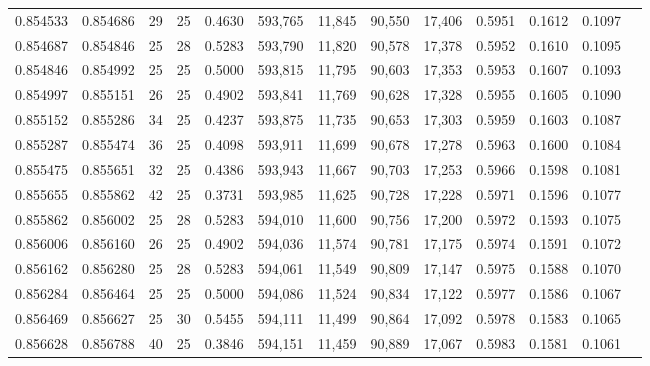 \begin{tabular}{rrrrrrrrrrrrr}
0.854533 & 0.854686 &    29 &  25 &                                     0.4630 & 593,765 &  11,845 &  90,550 &  17,406 & 0.5951 & 0.1612 & 0.1097 \\
0.854687 & 0.854846 &    25 &  28 &                                     0.5283 & 593,790 &  11,820 &  90,578 &  17,378 & 0.5952 & 0.1610 & 0.1095 \\
0.854846 & 0.854992 &    25 &  25 &                                     0.5000 & 593,815 &  11,795 &  90,603 &  17,353 & 0.5953 & 0.1607 & 0.1093 \\
0.854997 & 0.855151 &    26 &  25 &                                     0.4902 & 593,841 &  11,769 &  90,628 &  17,328 & 0.5955 & 0.1605 & 0.1090 \\
0.855152 & 0.855286 &    34 &  25 &                                     0.4237 & 593,875 &  11,735 &  90,653 &  17,303 & 0.5959 & 0.1603 & 0.1087 \\
0.855287 & 0.855474 &    36 &  25 &                                     0.4098 & 593,911 &  11,699 &  90,678 &  17,278 & 0.5963 & 0.1600 & 0.1084 \\
0.855475 & 0.855651 &    32 &  25 &                                     0.4386 & 593,943 &  11,667 &  90,703 &  17,253 & 0.5966 & 0.1598 & 0.1081 \\
0.855655 & 0.855862 &    42 &  25 &                                     0.3731 & 593,985 &  11,625 &  90,728 &  17,228 & 0.5971 & 0.1596 & 0.1077 \\
0.855862 & 0.856002 &    25 &  28 &                                     0.5283 & 594,010 &  11,600 &  90,756 &  17,200 & 0.5972 & 0.1593 & 0.1075 \\
0.856006 & 0.856160 &    26 &  25 &                                     0.4902 & 594,036 &  11,574 &  90,781 &  17,175 & 0.5974 & 0.1591 & 0.1072 \\
0.856162 & 0.856280 &    25 &  28 &                                     0.5283 & 594,061 &  11,549 &  90,809 &  17,147 & 0.5975 & 0.1588 & 0.1070 \\
0.856284 & 0.856464 &    25 &  25 &                                     0.5000 & 594,086 &  11,524 &  90,834 &  17,122 & 0.5977 & 0.1586 & 0.1067 \\
0.856469 & 0.856627 &    25 &  30 &                                     0.5455 & 594,111 &  11,499 &  90,864 &  17,092 & 0.5978 & 0.1583 & 0.1065 \\
0.856628 & 0.856788 &    40 &  25 &                                     0.3846 & 594,151 &  11,459 &  90,889 &  17,067 & 0.5983 & 0.1581 & 0.1061 \\

\end{tabular}
